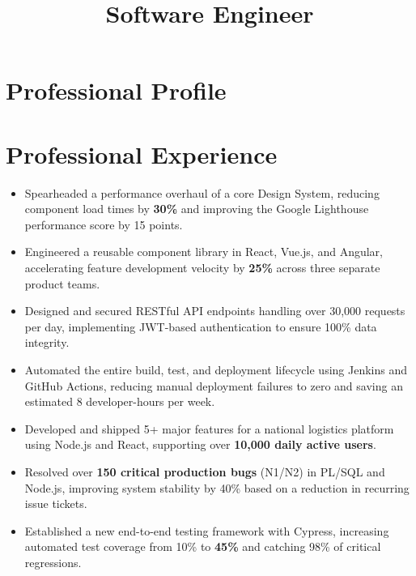 \documentclass[10pt,a4paper,sans]{moderncv}
\title{Software Engineer}
\begin{document}
\makecvtitle

\section{Professional Profile}

\section{Professional Experience}
{
    \begin{itemize}
        \item Spearheaded a performance overhaul of a core Design System, reducing component load times by \textbf{30\%} and improving the Google Lighthouse performance score by 15 points.
        \item Engineered a reusable component library in React, Vue.js, and Angular, accelerating feature development velocity by \textbf{25\%} across three separate product teams.
        \item Designed and secured RESTful API endpoints handling over 30,000 requests per day, implementing JWT-based authentication to ensure 100\% data integrity.
        \item Automated the entire build, test, and deployment lifecycle using Jenkins and GitHub Actions, reducing manual deployment failures to zero and saving an estimated 8 developer-hours per week.
    \end{itemize}
}

{
    \begin{itemize}
        \item Developed and shipped 5+ major features for a national logistics platform using Node.js and React, supporting over \textbf{10,000 daily active users}.
        \item Resolved over \textbf{150 critical production bugs} (N1/N2) in PL/SQL and Node.js, improving system stability by 40\% based on a reduction in recurring issue tickets.
        \item Established a new end-to-end testing framework with Cypress, increasing automated test coverage from 10\% to \textbf{45\%} and catching 98\% of critical regressions.
    \end{itemize}
}
\end{document}
